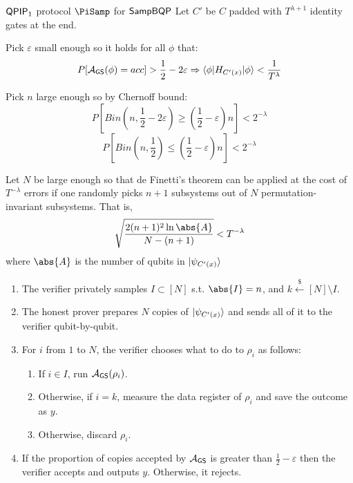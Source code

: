 \begin{protocol}{$\operatorname{\mathsf{QPIP}}_1$ protocol $\PiSamp$ for $\operatorname{\mathsf{SampBQP}}$}\label{ProtoQPIP1}
	Let $C'$ be $C$ padded with $T^{\lambda + 1}$ identity gates at the end.

	Pick $\varepsilon$ small enough so it holds for all $\phi$ that:
	\begin{equation}
		\label{QPIP1eps}
		P[\mathcal{A}_{\mathsf{GS}}(\phi)=acc]>\frac{1}{2}-2\varepsilon\Rightarrow\braket{\phi|H_{C'(x)}|\phi}<\frac{1}{T^\lambda}
	\end{equation}

	Pick $n$ large enough so by Chernoff bound:
	\begin{equation}
		\label{QPIP1Chernoff1}
		P\left[Bin(n, \frac{1}{2}-2\varepsilon)\geq\left(\frac{1}{2}-\varepsilon\right)n\right]<2^{-\lambda}
	\end{equation}
	\begin{equation}
		\label{QPIP1Chernoff2}
		P\left[Bin(n, \frac{1}{2})\leq\left(\frac{1}{2}-\varepsilon\right)n\right]<2^{-\lambda}
	\end{equation}

	Let $N$ be large enough so that de Finetti's theorem can be applied at the cost of $T^{-\lambda}$ errors if one randomly picks $n+1$ subsystems out of $N$ permutation-invariant subsystems.
		That is,
		$$\sqrt{\frac{2(n+1)^2\ln\abs{A}}{N-(n+1)}}<T^{-\lambda}$$
		where $\abs{A}$ is the number of qubits in $\ket{\psi_{C'(x)}}$

	\begin{enumerate}
		\item The verifier privately samples $I\subset[N]$ s.t. $\abs{I}=n$, and $k\xleftarrow{\$}[N]\setminus I$.
		\item The honest prover prepares $N$ copies of $\ket{\psi_{C'(x)}}$ and sends all of it to the verifier qubit-by-qubit.
		\item For $i$ from $1$ to $N$, the verifier chooses what to do to $\rho_i$ as follows:
		\begin{enumerate}
			\item If $i\in I$, run $\mathcal{A}_{\mathsf{GS}}(\rho_i)$.
			\item Otherwise, if $i=k$, measure the data register of $\rho_i$ and save the outcome as $y$.
			\item Otherwise, discard $\rho_i$.
		\end{enumerate}
		\item If the proportion of copies accepted by $\mathcal{A}_{\mathsf{GS}}$ is greater than $\frac{1}{2}-\varepsilon$ then the verifier accepts and outputs $y$. Otherwise, it rejects.
	\end{enumerate}
\end{protocol}

